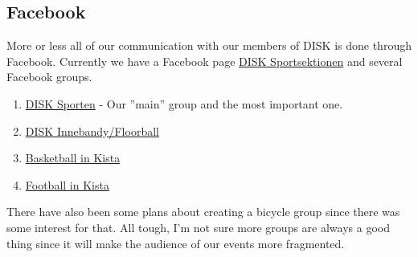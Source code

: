 \documentclass[12pt,a4paper]{article}
\begin{document}
		\subsection{Facebook}
			More or less all of our communication with our members of DISK is done through Facebook. Currently we have a Facebook page \href{https://www.facebook.com/sportsektionen/}{DISK Sportsektionen} and several Facebook groups.
			\begin{enumerate}
				\item \href{https://www.facebook.com/groups/246028798885289/}{DISK Sporten} - Our ''main'' group and the most important one.
				\item \href{https://www.facebook.com/groups/327491804118502/}{DISK Innebandy/Floorball}
				\item \href{https://www.facebook.com/groups/487598864634303/}{Basketball in Kista}
				\item \href{https://www.facebook.com/groups/946110802104272/}{Football in Kista}
			\end{enumerate}
			There have also been some plans about creating a bicycle group since there was some interest for that. All tough, I'm not sure more groups are always a good thing since it will make the audience of our events more fragmented.
\end{document}

